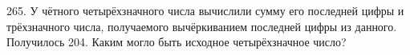 265. У чётного четырёхзначного числа вычислили сумму его последней цифры и трёхзначного числа, получаемого вычёркиванием последней цифры из данного. Получилось 204. Каким могло быть исходное четырёхзначное число?\\
